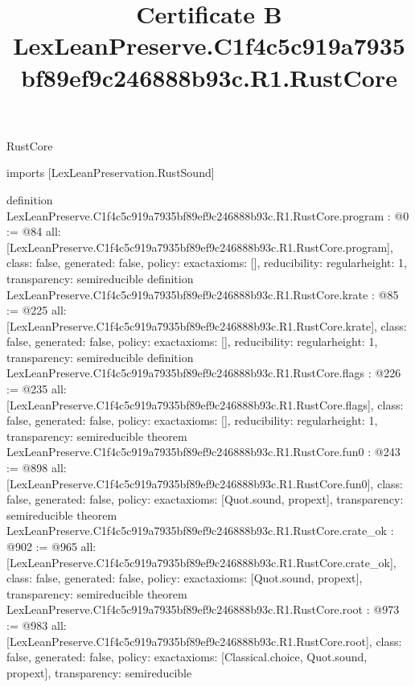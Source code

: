 \begin{lexlean}{RustCore}
\title{Certificate B LexLeanPreserve.C1f4c5c919a7935bf89ef9c246888b93c.R1.RustCore}
\begin{coremodule}
imports [LexLeanPreservation.RustSound]

definition LexLeanPreserve.C1f4c5c919a7935bf89ef9c246888b93c.R1.RustCore.program : @0 := @84 {
  all: [LexLeanPreserve.C1f4c5c919a7935bf89ef9c246888b93c.R1.RustCore.program],
  class: false,
  generated: false,
  policy: exact{axioms: []},
  reducibility: regular{height: 1},
  transparency: semireducible
}
definition LexLeanPreserve.C1f4c5c919a7935bf89ef9c246888b93c.R1.RustCore.krate : @85 := @225 {
  all: [LexLeanPreserve.C1f4c5c919a7935bf89ef9c246888b93c.R1.RustCore.krate],
  class: false,
  generated: false,
  policy: exact{axioms: []},
  reducibility: regular{height: 1},
  transparency: semireducible
}
definition LexLeanPreserve.C1f4c5c919a7935bf89ef9c246888b93c.R1.RustCore.flags : @226 := @235 {
  all: [LexLeanPreserve.C1f4c5c919a7935bf89ef9c246888b93c.R1.RustCore.flags],
  class: false,
  generated: false,
  policy: exact{axioms: []},
  reducibility: regular{height: 1},
  transparency: semireducible
}
theorem LexLeanPreserve.C1f4c5c919a7935bf89ef9c246888b93c.R1.RustCore.fun0 : @243 := @898 {
  all: [LexLeanPreserve.C1f4c5c919a7935bf89ef9c246888b93c.R1.RustCore.fun0],
  class: false,
  generated: false,
  policy: exact{axioms: [Quot.sound, propext]},
  transparency: semireducible
}
theorem LexLeanPreserve.C1f4c5c919a7935bf89ef9c246888b93c.R1.RustCore.crate_ok : @902 := @965 {
  all: [LexLeanPreserve.C1f4c5c919a7935bf89ef9c246888b93c.R1.RustCore.crate_ok],
  class: false,
  generated: false,
  policy: exact{axioms: [Quot.sound, propext]},
  transparency: semireducible
}
theorem LexLeanPreserve.C1f4c5c919a7935bf89ef9c246888b93c.R1.RustCore.root : @973 := @983 {
  all: [LexLeanPreserve.C1f4c5c919a7935bf89ef9c246888b93c.R1.RustCore.root],
  class: false,
  generated: false,
  policy: exact{axioms: [Classical.choice, Quot.sound, propext]},
  transparency: semireducible
}


\end{coremodule}
\end{lexlean}
